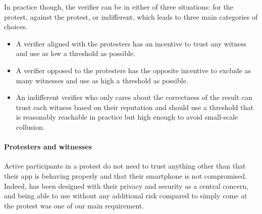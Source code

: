 In practice though, the verifier can be in either of three situations: for the protest, against the protest, or indifferent, which leads to three main categories of choices.
\begin{itemize}
	\item A verifier aligned with the protesters has an incentive to trust any witness and use as low a threshold as possible.
	\item A verifier opposed to the protesters has the opposite incentive to exclude as many witnesses and use as high a threshold as possible.
	\item An indifferent verifier who only cares about the correctness of the result can trust each witness based on their reputation and should use a threshold that is reasonably reachable in practice but high enough to avoid small-scale collusion.
\end{itemize}

\paragraph{Protesters and witnesses} Active participants in a protest do not need to trust anything other than that their app is behaving properly and that their smartphone is not compromised. Indeed, \CROCUS has been designed with their privacy and security as a central concern, and being able to use \CROCUS without any additional risk compared to simply come at the protest was one of our main requirement.
